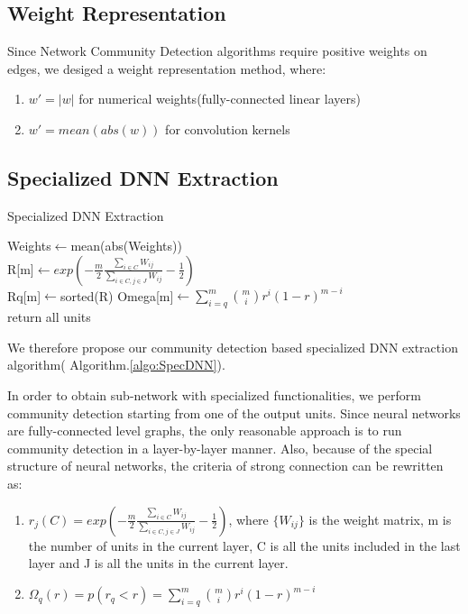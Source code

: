 \documentclass{acmtog} %
\begin{document}
\subsection*{Weight Representation}
%
Since Network Community Detection algorithms require positive weights on edges, we desiged a weight representation method, where:
\begin{enumerate}
	\item $w'=|w|$ for numerical weights(fully-connected linear layers)\\
    \item $w'=mean(abs(w))$ for convolution kernels
\end{enumerate}

\subsection*{Specialized DNN Extraction}
\begin{algorithm}\label{algo:SpecDNN}
            \caption{Specialized DNN Extraction}
            Weights$\leftarrow$mean(abs(Weights))\\
            R[m]$\leftarrow exp(-\frac{m}{2}\frac{\sum_{i\in C}W_{ij}}{\sum_{i\in C,j\in J}W_{ij}}-\frac{1}{2})$\\
            Rq[m]$\leftarrow$sorted(R)
            Omega[m]$\leftarrow\sum_{i=q}^{m}\binom{m}{i}r^i(1-r)^{m-i}$\\
            return all units
\end{algorithm}
%
We therefore propose our community detection based specialized DNN extraction algorithm( Algorithm.\ref{algo:SpecDNN}).

In order to obtain sub-network with specialized functionalities, we perform community detection starting from one of the output units. Since neural networks are fully-connected level graphs, the only reasonable approach is to run community detection in a layer-by-layer manner. Also, because of the special structure of neural networks, the criteria of strong connection can be rewritten as:
\begin{enumerate}
		\item $r_{j}(C )=exp(-\frac{m}{2}\frac{\sum_{i\in C}W_{ij}}{\sum_{i\in C,j\in J}W_{ij}}-\frac{1}{2})$, where $\{W_{ij}\}$ is the weight matrix, m is the number of units in the current layer, C is all the units included in the last layer and J is all the units in the current layer.
        \item $\Omega_{q}(r )=p(r_{q}<r)=\sum_{i=q}^{m}\binom{m}{i}r^i(1-r)^{m-i}$
\end{enumerate}
\end{document}
